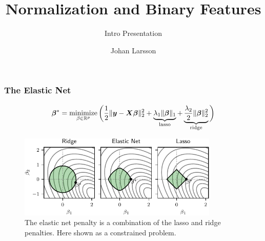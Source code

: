 \documentclass[10pt]{beamer}
\title{Normalization and Binary Features}
\subtitle{Intro Presentation}
\author{Johan Larsson}
\institute{Department of Mathemathical Sciences, University of Copenhagen}
\begin{document}
\maketitle

\begin{frame}[c]
  \frametitle{The Elastic Net}

  \begin{equation*}
    \bm{\beta}^* = \operatorname*{minimize}_{\beta \in \mathbb{R}^p} \bigg( \frac{1}{2} \lVert \bm{y} - \bm{X}\bm{\beta} \rVert^2_2  + \underbrace{\lambda_1 \lVert \bm{\beta} \rVert_1}_\text{lasso} + \underbrace{\frac{\lambda_2}{2}\lVert \bm{\beta} \rVert_2^2}_\text{ridge}\bigg)
  \end{equation*}

  \pause

  \begin{figure}
    \centering
    \includegraphics[width=0.85\textwidth]{images/paper6-elasticnet-balls.pdf}
    \caption{%
      The elastic net penalty is a combination of the lasso and ridge penalties. Here shown as a constrained problem.
    }
  \end{figure}
\end{frame}
\end{document}

